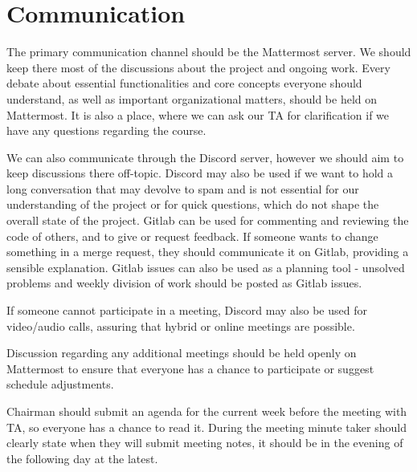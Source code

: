 \section{Communication}

The primary communication channel should be the Mattermost server. We should keep there most of the discussions about the project and ongoing work. Every debate about essential functionalities and core concepts everyone should understand, as well as important organizational matters, should be held on Mattermost. It is also a place, where we can ask our TA for clarification if we have any questions regarding the course.

We can also communicate through the Discord server, however we should aim to keep discussions there off-topic. Discord may also be used if we want to hold a long conversation that may devolve to spam and is not essential for our understanding of the project or for quick questions, which do not shape the overall state of the project. Gitlab can be used for commenting and reviewing the code of others, and to give or request feedback. If someone wants to change something in a merge request, they should communicate it on Gitlab, providing a sensible explanation. Gitlab issues can also be used as a planning tool - unsolved problems and weekly division of work should be posted as Gitlab issues.

If someone cannot participate in a meeting, Discord may also be used for video/audio calls, assuring that hybrid or online meetings are possible.

Discussion regarding any additional meetings should be held openly on Mattermost to ensure that everyone has a chance to participate or suggest schedule adjustments.

Chairman should submit an agenda for the current week before the meeting with TA, so everyone has a chance to read it. During the meeting minute taker should clearly state when they will submit meeting notes, it should be in the evening of the following day at the latest.

